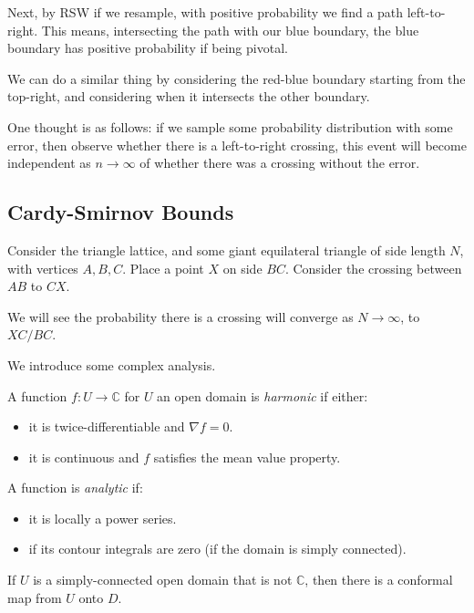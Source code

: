 \documentclass[12pt]{article}
\begin{document}
Next, by RSW if we resample, with positive probability we find a path left-to-right. This means, intersecting the path with our blue boundary, the blue boundary has positive probability if being pivotal.

We can do a similar thing by considering the red-blue boundary starting from the top-right, and considering when it intersects the other boundary.

One thought is as follows: if we sample some probability distribution with some error, then observe whether there is a left-to-right crossing, this event will become independent as $n \to \infty$ of whether there was a crossing without the error.

\subsection{Cardy-Smirnov Bounds}%
\label{sub:smir}

Consider the triangle lattice, and some giant equilateral triangle of side length $N$, with vertices $A, B, C$. Place a point $X$ on side $BC$. Consider the crossing between $AB$ to $CX$.

We will see the probability there is a crossing will converge as $N \to \infty$, to $XC/BC$.

We introduce some complex analysis.

\begin{definition}
	A function $f : U \to \mathbb{C}$ for $U$ an open domain is \emph{harmonic} if either:
	\begin{itemize}
		\item it is twice-differentiable and $\nabla f = 0$.
		\item it is continuous and $f$ satisfies the mean value property.
	\end{itemize}
	A function is \emph{analytic} if:
	\begin{itemize}
		\item it is locally a power series.
		\item if its contour integrals are zero (if the domain is simply connected).
	\end{itemize}
\end{definition}

\begin{theorem}
	If $U$ is a simply-connected open domain that is not $\mathbb{C}$, then there is a conformal map from $U$ onto $D$.
\end{theorem}
\end{document}
